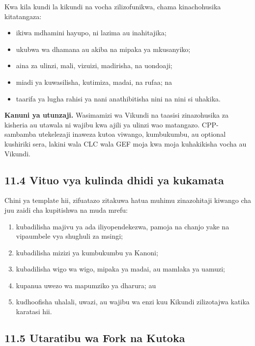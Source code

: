 \documentclass[11pt]{article}
\begin{document}
Kwa kila kundi la kikundi na vocha zilizofunikwa, chama kinachohusika kitatangaza:

\begin{itemize}[leftmargin=*]
\item ikiwa mdhamini hayupo, ni lazima au inahitajika;
\item ukubwa wa dhamana au akiba na mipaka ya mkusanyiko;
\item aina za ulinzi, mali, vizuizi, madirisha, na uondoaji;
\item miadi ya kuwasilisha, kutimiza, madai, na rufaa; na
\item taarifa ya lugha rahisi ya nani anathibitisha nini na nini si uhakika.
\end{itemize}
\textbf{Kanuni ya utunzaji.} Wasimamizi wa Vikundi na taasisi zinazohusika za kisheria au utawala ni wajibu kwa ajili ya ulinzi wao matangazo. CPP- sambamba utekelezaji inaweza kutoa viwango, kumbukumbu, au optional kushiriki sera, lakini wala CLC wala GEF moja kwa moja kuhakikisha vocha au Vikundi.

\subsection*{11.4 Vituo vya kulinda dhidi ya kukamata}

Chini ya template hii, zifuatazo zitakuwa hatua muhimu zinazohitaji kiwango cha juu zaidi cha kupitishwa na muda mrefu:

\begin{enumerate}[leftmargin=*]
\item kubadilisha majivu ya ada iliyopendekezwa, pamoja na chanjo yake na vipaumbele vya shughuli za msingi;
\item kubadilisha mizizi ya kumbukumbu ya Kanoni;
\item kubadilisha wigo wa wigo, mipaka ya madai, au mamlaka ya uamuzi;
\item kupanua uwezo wa mapumziko ya dharura; au
\item kudhoofisha uhalali, uwazi, au wajibu wa enzi kuu Kikundi zilizotajwa katika karatasi hii.
\end{enumerate}
\subsection*{11.5 Utaratibu wa Fork na Kutoka}
\end{document}
